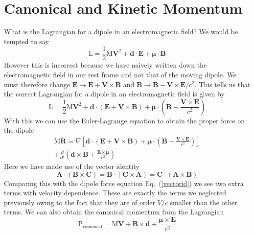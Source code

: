 \documentclass[twocolumn,english,pra,aps,superscriptaddress,floatfix]{revtex4-1}
\begin{document}
\section{Canonical and Kinetic Momentum}
\label{sec:material}
What is the Lagrangian for a dipole in an electromagnetic field?  We would be tempted to say
\begin{equation}
\mathrm{L}=\frac{1}{2}\mathrm{M}\mathbf{V}^2 + \mathbf{d}\cdot\mathbf{E} + \mathbf{\mu}\cdot\mathbf{B}
\label{lagrangian1}
\end{equation}
However this is incorrect because we have naively written down the electromagnetic field in our rest frame and not that of the moving dipole.  We must therefore change $\mathbf{E}\rightarrow\mathbf{E}+\mathbf{V}\times\mathbf{B}$ and $\mathbf{B}\rightarrow\mathbf{B}-\mathbf{V}\times\mathbf{E}/c^2$. This tells us that the correct Lagrangian for a dipole in an electromagnetic field is given by
\begin{equation}
\mathrm{L}=\frac{1}{2}\mathrm{M}\mathbf{V}^2 + \mathbf{d}\cdot\left(\mathbf{E} +\mathbf{V}\times\mathbf{B}\right)+ \mathbf{\mu}\cdot\left(\mathbf{B}-\frac{\mathbf{V}\times\mathbf{E}}{c^2}\right)
\label{lagrangian2}
\end{equation}
With this we can use the Euler-Lagrange equation to obtain the proper force on the dipole
\begin{eqnarray}
&\mathrm{M}\ddot{\mathbf{R}}=\nabla\left[ \mathbf{d}\cdot\left(\mathbf{E}+\mathbf{V}\times\mathbf{B}\right)+ \mathbf{\mu}\cdot\left(\mathbf{B}-\frac{\mathbf{V}\times\mathbf{E}}{c^2}\right)\right]& \nonumber \\
& +\frac{\partial}{\partial t}\left(\mathbf{d}\times\mathbf{B} + \frac{\mathbf{E}\times\mathbf{\mu}}{c^2}\right)&
\label{lorentz2}
\end{eqnarray}
Here we have made use of the vector identity
\begin{equation}
\mathbf{A}\cdot\left(\mathbf{B}\times\mathbf{C}\right)=\mathbf{B}\cdot\left(\mathbf{C}\times\mathbf{A}\right)=\mathbf{C}\cdot\left(\mathbf{A}\times\mathbf{B}\right)
\label{vectorid3}
\end{equation}
Comparing this with the dipole force equation Eq.\ (\ref{vectorid}) we see two extra terms with velocity dependence.  These are exactly the terms we neglected previously owing to the fact that they are of order $V/c$ smaller than the other terms.  We can also obtain the canonical momentum from the Lagrangian
\begin{equation}
\mathrm{P}_{\mathrm{canonical}}=\mathrm{M}\mathbf{V} + \mathbf{B}\times\mathbf{d}+ \frac{\mathbf{\mu}\times\mathbf{E}}{c^2}
\label{lagrangian2}
\end{equation}
\end{document}
